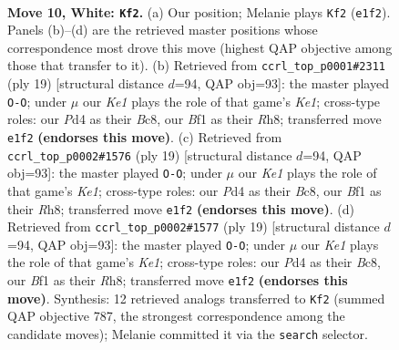 \documentclass[11pt]{article}
\begin{document}
\clearpage

\begin{figure}[p]\centering
\begin{subfigure}{0.46\textwidth}\centering
\resizebox{\linewidth}{!}{%
\newchessgame
\chessboard[
  setfen={rnb2rk1/1ppn1ppp/p3p3/3pP3/1q1P1P1P/2N5/PPP3P1/1R1QKBNR w K - 3 10},
  showmover=false,
  pgfstyle=straightmove, color=movearrow, markmove={e1-f2}
]}
\caption{}
\end{subfigure}\hfill
\begin{subfigure}{0.46\textwidth}\centering
\resizebox{\linewidth}{!}{%
\newchessgame
\chessboard[
  setfen={1rbqk2r/ppp2ppp/2n1p3/8/QnpP4/N4NP1/PP2PPBP/R4RK1 b k - 3 10},
  showmover=false,
  pgfstyle=straightmove, color=movearrow, markmove={e8-g8}
]}
\caption{}
\end{subfigure}
\\[4pt]
\begin{subfigure}{0.46\textwidth}\centering
\resizebox{\linewidth}{!}{%
\newchessgame
\chessboard[
  setfen={1rbqk2r/ppp2ppp/2n1p3/8/QnpP4/N4NP1/PP2PPBP/R4RK1 b k - 3 10},
  showmover=false,
  pgfstyle=straightmove, color=movearrow, markmove={e8-g8}
]}
\caption{}
\end{subfigure}\hfill
\begin{subfigure}{0.46\textwidth}\centering
\resizebox{\linewidth}{!}{%
\newchessgame
\chessboard[
  setfen={1rbqk2r/ppp2ppp/2n1p3/8/QnpP4/N4NP1/PP2PPBP/R4RK1 b k - 3 10},
  showmover=false,
  pgfstyle=straightmove, color=movearrow, markmove={e8-g8}
]}
\caption{}
\end{subfigure}
\caption{\textbf{Move 10, White: \texttt{Kf2}.} (a) Our position; Melanie plays \texttt{Kf2} (\texttt{e1f2}). Panels (b)--(d) are the retrieved master positions whose correspondence most drove this move (highest QAP objective among those that transfer to it). (b) Retrieved from \texttt{ccrl\_top\_p0001\#2311} (ply 19) [structural distance $d$=94, QAP obj=93]: the master played \texttt{O-O}; under $\mu$ our \emph{Ke1} plays the role of that game's \emph{Ke1}; cross-type roles: our \emph{P}d4 as their \emph{B}c8, our \emph{B}f1 as their \emph{R}h8; transferred move \texttt{e1f2} \textbf{(endorses this move)}. (c) Retrieved from \texttt{ccrl\_top\_p0002\#1576} (ply 19) [structural distance $d$=94, QAP obj=93]: the master played \texttt{O-O}; under $\mu$ our \emph{Ke1} plays the role of that game's \emph{Ke1}; cross-type roles: our \emph{P}d4 as their \emph{B}c8, our \emph{B}f1 as their \emph{R}h8; transferred move \texttt{e1f2} \textbf{(endorses this move)}. (d) Retrieved from \texttt{ccrl\_top\_p0002\#1577} (ply 19) [structural distance $d$=94, QAP obj=93]: the master played \texttt{O-O}; under $\mu$ our \emph{Ke1} plays the role of that game's \emph{Ke1}; cross-type roles: our \emph{P}d4 as their \emph{B}c8, our \emph{B}f1 as their \emph{R}h8; transferred move \texttt{e1f2} \textbf{(endorses this move)}. Synthesis: 12 retrieved analogs transferred to \texttt{Kf2} (summed QAP objective 787, the strongest correspondence among the candidate moves); Melanie committed it via the \texttt{search} selector.}
\label{fig:thought-m18}
\end{figure}
\end{document}
